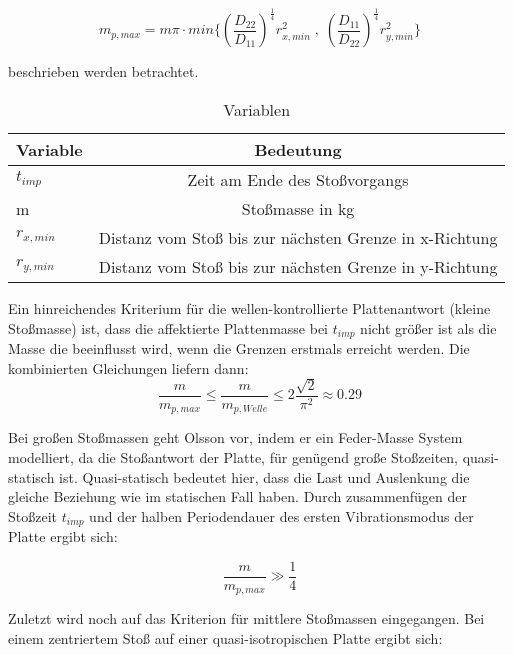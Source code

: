 \begin{equation}
	m_{p,max} = m \pi \cdot min\{(\frac{D_{22}}{D_{11}})^{\frac{1}{4}} r_{x,min}^{2} \; , \; (\frac{D_{11}}{D_{22}})^{\frac{1}{4}} r_{y,min}^{2} \}
\end{equation}		
		
beschrieben werden betrachtet. 

\begin{table}[h!]
	\begin{center}
		\caption{Variablen}
		\label{tab:Tabelle 2}
		\begin{tabular}{l|c}
			\textbf{Variable} & \textbf{Bedeutung}\\
			\hline
			$t_{imp}$ & Zeit am Ende des Stoßvorgangs\\
			m & Stoßmasse in kg\\
			$r_{x,min}$ & Distanz vom Stoß bis zur nächsten Grenze in x-Richtung\\
			$r_{y,min}$ & Distanz vom Stoß bis zur nächsten Grenze in y-Richtung\\
		\end{tabular}
	\end{center}
\end{table}

Ein hinreichendes Kriterium für die wellen-kontrollierte Plattenantwort (kleine Stoßmasse) ist, dass die affektierte Plattenmasse bei $t_{imp}$ nicht größer ist als die Masse die beeinflusst wird, wenn die Grenzen erstmals erreicht werden. Die kombinierten Gleichungen liefern dann: 
\begin{equation}
	\frac{m}{m_{p,max}} \leq \frac{m}{m_{p,Welle}} \leq 2 \frac{\sqrt{2}}{\pi^{2}} \approx 0.29
\end{equation}

Bei großen Stoßmassen geht Olsson vor, indem er ein Feder-Masse System modelliert, da die Stoßantwort der Platte, für genügend große Stoßzeiten, quasi-statisch ist. Quasi-statisch bedeutet hier, dass die Last und Auslenkung die gleiche Beziehung wie im statischen Fall haben. Durch zusammenfügen der Stoßzeit $t_{imp}$ und der halben Periodendauer des ersten Vibrationsmodus der Platte ergibt sich: 

\begin{equation}
	\frac{m}{m_{p,max}} \gg \frac{1}{4}
\end{equation}

Zuletzt wird noch auf das Kriterion für mittlere Stoßmassen eingegangen. Bei einem zentriertem Stoß auf einer quasi-isotropischen Platte ergibt sich:

